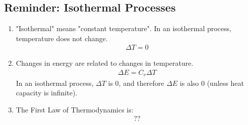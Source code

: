 \documentclass{article}  %
\begin{document}
\subsection*{Reminder: Isothermal Processes}
\begin{enumerate}
    \item "Isothermal" means "constant temperature". In an isothermal process, temperature does not change.
        \begin{equation*}
            \begin{aligned}
                \Delta T = 0
            \end{aligned}
        \end{equation*}
    \item Changes in energy are related to changes in temperature.
        \begin{equation*}
            \begin{aligned}
                \Delta E = C_v \Delta T
            \end{aligned}
        \end{equation*}
    In an isothermal process, $\Delta T$ is 0, and therefore $\Delta E$ is also 0 (unless heat capacity is infinite).
    \item The First Law of Thermodynamics is:
        \begin{equation*}
            \begin{aligned}
                ?? %
            \end{aligned}
        \end{equation*}
\end{enumerate}
\end{document}
